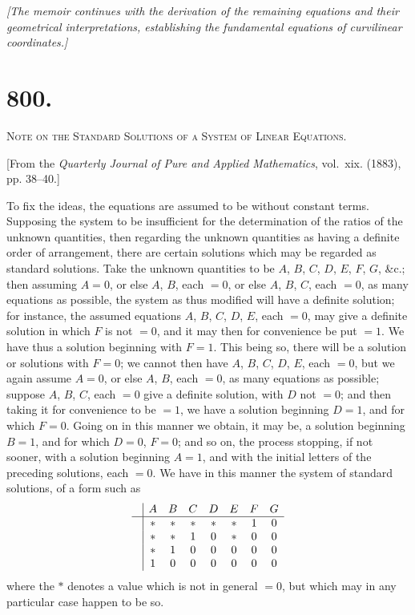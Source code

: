 \documentclass[11pt,a4paper]{article}
\theoremstyle{definition}
\theoremstyle{remark}
\begin{document}
\vspace{0.5cm}
\noindent\textit{[The memoir continues with the derivation of the remaining equations and their geometrical interpretations, establishing the fundamental equations of curvilinear coordinates.]}
\vspace{0.5cm}



\newpage
\section*{800.}
\begin{center}
{\large\scshape Note on the Standard Solutions of a System of Linear Equations.}
\end{center}

\begin{flushright}
\small[From the \textit{Quarterly Journal of Pure and Applied Mathematics}, vol.~xix. (1883),\\
pp. 38--40.]
\end{flushright}

To fix the ideas, the equations are assumed to be without constant terms. Supposing the system to be insufficient for the determination of the ratios of the unknown quantities, then regarding the unknown quantities as having a definite order of arrangement, there are certain solutions which may be regarded as standard solutions. Take the unknown quantities to be $A$, $B$, $C$, $D$, $E$, $F$, $G$, \&c.; then assuming $A=0$, or else $A$, $B$, each $=0$, or else $A$, $B$, $C$, each $=0$, as many equations as possible, the system as thus modified will have a definite solution; for instance, the assumed equations $A$, $B$, $C$, $D$, $E$, each $=0$, may give a definite solution in which $F$ is not $=0$, and it may then for convenience be put $=1$. We have thus a solution beginning with $F=1$. This being so, there will be a solution or solutions with $F=0$; we cannot then have $A$, $B$, $C$, $D$, $E$, each $=0$, but we again assume $A=0$, or else $A$, $B$, each $=0$, as many equations as possible; suppose $A$, $B$, $C$, each $=0$ give a definite solution, with $D$ not $=0$; and then taking it for convenience to be $=1$, we have a solution beginning $D=1$, and for which $F=0$. Going on in this manner we obtain, it may be, a solution beginning $B=1$, and for which $D=0$, $F=0$; and so on, the process stopping, if not sooner, with a solution beginning $A=1$, and with the initial letters of the preceding solutions, each $=0$. We have in this manner the system of standard solutions, of a form such as
\[
\begin{array}{c|ccccccc}
& A & B & C & D & E & F & G \\ \hline
& * & * & * & * & * & 1 & 0 \\
& * & * & 1 & 0 & * & 0 & 0 \\
& * & 1 & 0 & 0 & 0 & 0 & 0 \\
& 1 & 0 & 0 & 0 & 0 & 0 & 0
\end{array}
\]
where the $*$ denotes a value which is not in general $=0$, but which may in any particular case happen to be so.
\end{document}
